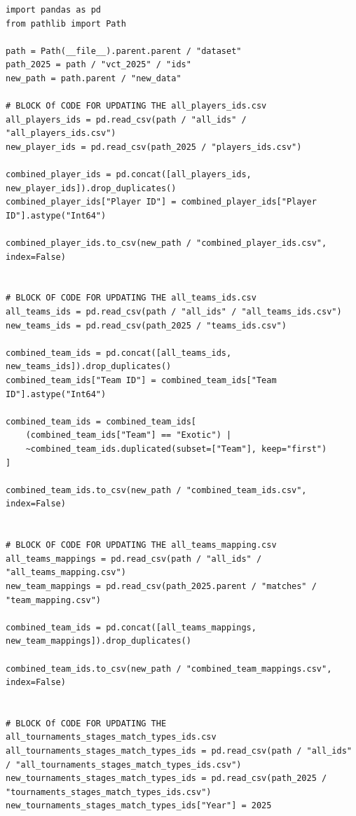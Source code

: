 \begin{lstlisting}[style=code,caption={Function for updating the dataset to include 2025 statistics.},label={lst:updateDataset}]
import pandas as pd
from pathlib import Path

path = Path(__file__).parent.parent / "dataset"
path_2025 = path / "vct_2025" / "ids"
new_path = path.parent / "new_data"

# BLOCK Of CODE FOR UPDATING THE all_players_ids.csv
all_players_ids = pd.read_csv(path / "all_ids" / "all_players_ids.csv")
new_player_ids = pd.read_csv(path_2025 / "players_ids.csv")

combined_player_ids = pd.concat([all_players_ids, new_player_ids]).drop_duplicates()
combined_player_ids["Player ID"] = combined_player_ids["Player ID"].astype("Int64")

combined_player_ids.to_csv(new_path / "combined_player_ids.csv", index=False)


# BLOCK OF CODE FOR UPDATING THE all_teams_ids.csv
all_teams_ids = pd.read_csv(path / "all_ids" / "all_teams_ids.csv")
new_teams_ids = pd.read_csv(path_2025 / "teams_ids.csv")

combined_team_ids = pd.concat([all_teams_ids, new_teams_ids]).drop_duplicates()
combined_team_ids["Team ID"] = combined_team_ids["Team ID"].astype("Int64")

combined_team_ids = combined_team_ids[
    (combined_team_ids["Team"] == "Exotic") | 
    ~combined_team_ids.duplicated(subset=["Team"], keep="first")
]

combined_team_ids.to_csv(new_path / "combined_team_ids.csv", index=False)


# BLOCK OF CODE FOR UPDATING THE all_teams_mapping.csv
all_teams_mappings = pd.read_csv(path / "all_ids" / "all_teams_mapping.csv")
new_team_mappings = pd.read_csv(path_2025.parent / "matches" / "team_mapping.csv")

combined_team_ids = pd.concat([all_teams_mappings, new_team_mappings]).drop_duplicates()

combined_team_ids.to_csv(new_path / "combined_team_mappings.csv", index=False)


# BLOCK Of CODE FOR UPDATING THE all_tournaments_stages_match_types_ids.csv
all_tournaments_stages_match_types_ids = pd.read_csv(path / "all_ids" / "all_tournaments_stages_match_types_ids.csv")
new_tournaments_stages_match_types_ids = pd.read_csv(path_2025 / "tournaments_stages_match_types_ids.csv")
new_tournaments_stages_match_types_ids["Year"] = 2025


\end{lstlisting}
